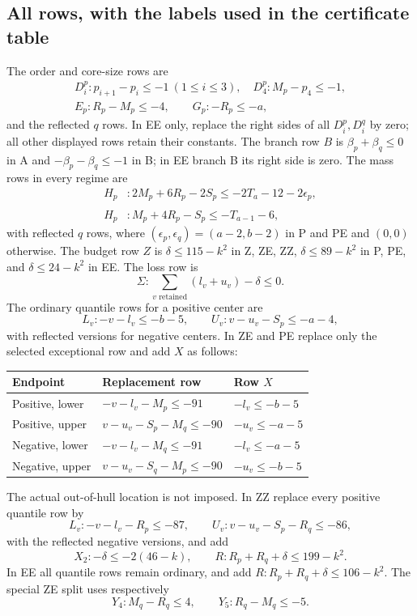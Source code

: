 \documentclass[11pt,a4paper]{article}
\theoremstyle{remark}
\begin{document}
\subsection{All rows, with the labels used in the certificate table}
The order and core-size rows are
\[
\begin{gathered}
 D_i^p:p_{i+1}-p_i\leq-1\ (1\leq i\leq3),\quad
 D_4^p:M_p-p_4\leq-1,\\
 E_p:R_p-M_p\leq-4,\qquad G_p:-R_p\leq-a,
\end{gathered}
\]
and the reflected $q$ rows. In EE only, replace the right sides of all
$D_i^p,D_i^q$ by zero; all other displayed rows retain their constants.
The branch row $B$ is $\beta_p+\beta_q\leq0$ in A and
$-\beta_p-\beta_q\leq-1$ in B; in EE branch B its right side is zero.
The mass rows in every regime are
\[
\begin{split}
 H_p &: 2M_p+6R_p-2S_p\leq-2T_a-12-2\epsilon_p,\\
 \widehat H_p &: M_p+4R_p-S_p\leq-T_{a-1}-6,
\end{split}
\]
with reflected $q$ rows, where $(\epsilon_p,\epsilon_q)=(a-2,b-2)$ in
P and PE and $(0,0)$ otherwise.
The budget row $Z$ is $\delta\leq115-k^2$ in Z, ZE, ZZ,
$\delta\leq89-k^2$ in P, PE, and $\delta\leq24-k^2$ in EE.
The loss row is
\[
 \Sigma:\sum_{v\text{ retained}}(l_v+u_v)-\delta\leq0.
\]
The ordinary quantile rows for a positive center are
\[
 L_v:-v-l_v\leq-b-5,\qquad
 U_v:v-u_v-S_p\leq-a-4,
\]
with reflected versions for negative centers. In ZE and PE replace only
the selected exceptional row and add $X$ as follows:
\begin{center}\small
\begin{tabular}{lll}
\toprule
Endpoint&Replacement row&Row $X$\\\midrule
Positive, lower&$-v-l_v-M_p\leq-91$&$-l_v\leq-b-5$\\
Positive, upper&$v-u_v-S_p-M_q\leq-90$&$-u_v\leq-a-5$\\
Negative, lower&$-v-l_v-M_q\leq-91$&$-l_v\leq-a-5$\\
Negative, upper&$v-u_v-S_q-M_p\leq-90$&$-u_v\leq-b-5$\\
\bottomrule
\end{tabular}
\end{center}
The actual out-of-hull location is not imposed. In ZZ replace every
positive quantile row by
\[
 L_v:-v-l_v-R_p\leq-87,\qquad
 U_v:v-u_v-S_p-R_q\leq-86,
\]
with the reflected negative versions, and add
\[
 X_2:-\delta\leq-2(46-k),\qquad
 R:R_p+R_q+\delta\leq199-k^2.
\]
In EE all quantile rows remain ordinary, and add
$R:R_p+R_q+\delta\leq106-k^2$.
The special ZE split uses respectively
\[
 Y_4:M_q-R_q\leq4,\qquad Y_5:R_q-M_q\leq-5.
\]
\end{document}
